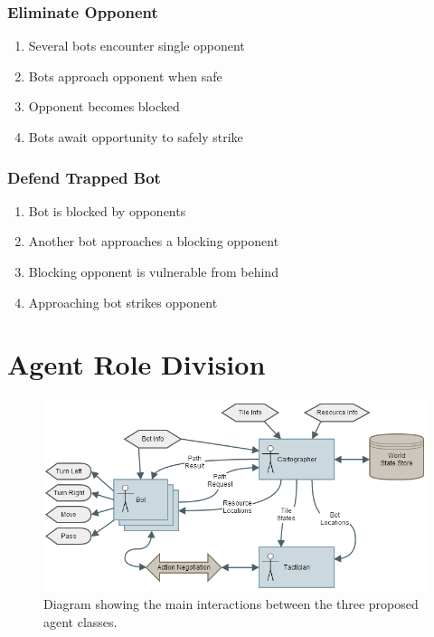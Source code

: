 \documentclass[a4paper,10pt]{article}
\begin{document}
\vspace{5mm}
\noindent
\begin{minipage}[t]{0.5\textwidth}
\subsubsection{Eliminate Opponent}
\begin{enumerate}
\item Several bots encounter single opponent
\item Bots approach opponent when safe
\item Opponent becomes blocked
\item Bots await opportunity to safely strike
\end{enumerate}
\end{minipage}%
\begin{minipage}[t]{0.5\textwidth}
\subsubsection{Defend Trapped Bot}
\begin{enumerate}
\item Bot is blocked by opponents
\item Another bot approaches a blocking opponent
\item Blocking opponent is vulnerable from behind
\item Approaching bot strikes opponent
\end{enumerate}
\end{minipage}

\section{Agent Role Division}
\vspace{-5mm}
\begin{figure}[ht]
  \centering
  \includegraphics[width=0.8\linewidth]{interaction}
  \caption{Diagram showing the main interactions between the three proposed agent classes.}
  \vspace{-5mm}
\end{figure}
\end{document}
